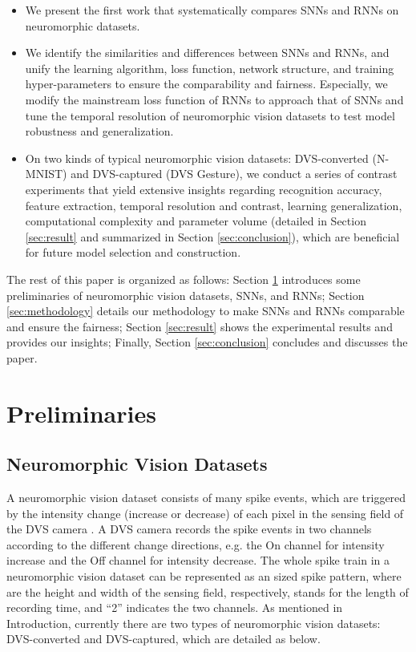 \documentclass[journal,10pt,twocolumn]{IEEETran}
\begin{document}
\begin{itemize}
\item We present the first work that systematically compares SNNs and RNNs on neuromorphic datasets.

\item We identify the similarities and differences between SNNs and RNNs, and unify the learning algorithm, loss function, network structure, and training hyper-parameters to ensure the comparability and fairness. Especially, we modify the mainstream loss function of RNNs to approach that of SNNs and tune the temporal resolution of neuromorphic vision datasets to test model robustness and generalization.

\item On two kinds of typical neuromorphic vision datasets: DVS-converted (N-MNIST) and DVS-captured (DVS Gesture), we conduct a series of contrast experiments that yield extensive insights regarding recognition accuracy, feature extraction, temporal resolution and contrast, learning generalization, computational complexity and parameter volume (detailed in Section \ref{sec:result} and summarized in Section \ref{sec:conclusion}), which are beneficial for future model selection and construction.
\end{itemize}

The rest of this paper is organized as follows: Section \ref{sec:preliminary} introduces some preliminaries of neuromorphic vision datasets, SNNs, and RNNs; Section \ref{sec:methodology} details our methodology to make SNNs and RNNs comparable and ensure the fairness; Section \ref{sec:result} shows the experimental results and provides our insights; Finally, Section \ref{sec:conclusion} concludes and discusses the paper. \section{Preliminaries}\label{sec:preliminary}

\subsection{Neuromorphic Vision Datasets}\label{sec:preliminary:dataset}

A neuromorphic vision dataset consists of many spike events, which are triggered by the intensity change (increase or decrease) of each pixel in the sensing field of the DVS camera \cite{delbruck2008frame,lichtsteiner2008128,hu2016dvs}. A DVS camera records the spike events in two channels according to the different change directions, e.g. the On channel for intensity increase and the Off channel for intensity decrease. The whole spike train in a neuromorphic vision dataset can be represented as an  sized spike pattern, where  are the height and width of the sensing field, respectively,  stands for the length of recording time, and ``2'' indicates the two channels. As mentioned in Introduction, currently there are two types of neuromorphic vision datasets: DVS-converted and DVS-captured, which are detailed as below.
\end{document}
